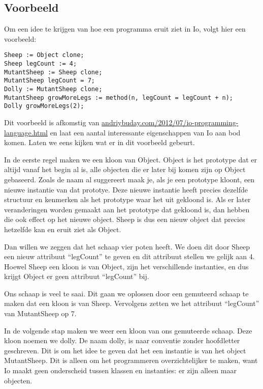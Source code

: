 \documentclass[12pt]{article}
\begin{document}
\pagebreak

\subsection*{Voorbeeld}
Om een idee te krijgen van hoe een programma eruit ziet in Io, volgt hier een voorbeeld:
\begin{lstlisting}[frame=single]
Sheep := Object clone;
Sheep legCount := 4;
MutantSheep := Sheep clone;
MutantSheep legCount = 7;
Dolly := MutantSheep clone;
MutantSheep growMoreLegs := method(n, legCount = legCount + n);
Dolly growMoreLegs(2);
\end{lstlisting}
Dit voorbeeld is afkomstig van \url{andriybuday.com/2012/07/io-programming-language.html} en laat een aantal interessante eigenschappen van Io aan bod komen. Laten we eens kijken wat er in dit voorbeeld gebeurt.

In de eerste regel maken we een kloon van Object. Object is het prototype dat er altijd vanaf het begin al is,
alle objecten die er later bij komen zijn op Object gebaseerd.
Zoals de naam al suggereert maak je, als je een prototype kloont, een nieuwe instantie van dat prototye.
Deze nieuwe instantie heeft precies dezelfde structuur en kenmerken als het prototype waar het uit gekloond is.
Als er later veranderingen worden gemaakt aan het prototype dat gekloond is, dan hebben die ook effect op het nieuwe object.
Sheep is dus een nieuw object dat precies hetzelfde kan en eruit ziet als Object.\newline

Dan willen we zeggen dat het schaap vier poten heeft.
We doen dit door Sheep een nieuw attribuut ``legCount'' te geven en dit attribuut stellen we gelijk aan 4.
Hoewel Sheep een kloon is van Object, zijn het verschillende instanties, en dus krijgt Object er geen attribuut ``legCount'' bij.\newline

Ons schaap is veel te saai. Dit gaan we oplossen door een gemuteerd schaap te maken dat een kloon is van Sheep. Vervolgens zetten we het attribuut ``legCount'' van MutantSheep op 7.\newline

In de volgende stap maken we weer een kloon van ons gemuteerde schaap. Deze kloon noemen we dolly. De naam dolly, is naar conventie zonder hoofdletter geschreven.
Dit is om het idee te geven dat het een instantie is van het object MutantSheep.
Dit is alleen om het programmeren overzichtelijker te maken, want Io maakt geen onderscheid tussen klassen en instanties: er zijn alleen maar objecten.\newline
\end{document}
